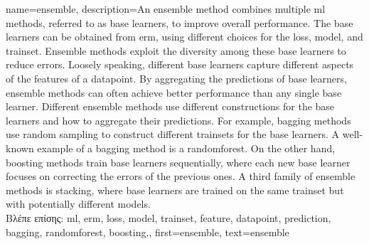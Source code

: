 {name={ensemble}, 
	description={An ensemble method combines multiple 
		\gls{ml} methods, referred to as base learners, to improve overall performance. 
		The base learners can be obtained from \gls{erm}, using different choices for 
	 	the \gls{loss}, \gls{model}, and \gls{trainset}. Ensemble methods exploit the 
	 	diversity among these base learners to reduce errors. Loosely speaking, different base 
	 	learners capture different aspects of the \gls{feature}s of a \gls{datapoint}. 
	 	By aggregating the \gls{prediction}s of base learners, ensemble methods can 
	 	often achieve better performance than any single base learner. Different  
	 	ensemble methods use different constructions for the base learners and how 
	 	to aggregate their \gls{prediction}s. For example, \gls{bagging} methods use random sampling 
	 	to construct different \gls{trainset}s for the base learners. A well-known example 
	 	of a \gls{bagging} method is a \gls{randomforest}. On the other hand, \gls{boosting} methods train 
	 	base learners sequentially, where each new base learner focuses on correcting the 
	 	errors of the previous ones. A third family of ensemble methods is stacking, 
	 	where base learners are trained on the same \gls{trainset} but with potentially different \gls{model}s. 
		\\
	 	\foreignlanguage{greek}{Βλέπε επίσης:} \gls{ml}, \gls{erm}, \gls{loss}, \gls{model}, \gls{trainset}, \gls{feature}, \gls{datapoint}, \gls{prediction}, 
		\gls{bagging}, \gls{randomforest}, \gls{boosting}.},
	 first={ensemble},
	 text={ensemble} 
}




